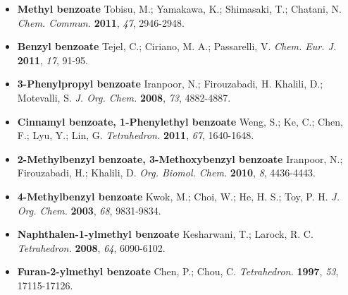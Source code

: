\frenchspacing
\begin{itemize}
  \item \textbf{Methyl benzoate} Tobisu, M.; Yamakawa, K.; Shimasaki,
  T.; Chatani, N. \textit{Chem. Commun.} \textbf{2011}, \textit{47}, 2946-2948.
  \item \textbf{Benzyl benzoate} Tejel, C.; Ciriano, M. A.; Passarelli, V.
  \textit{Chem. Eur. J.} \textbf{2011}, \textit{17}, 91-95.
  \item \textbf{3-Phenylpropyl benzoate} Iranpoor, N.; Firouzabadi,
  H. Khalili, D.; Motevalli, S. \textit{J. Org. Chem.} \textbf{2008},
  \textit{73}, 4882-4887.
   \item \textbf{Cinnamyl benzoate, 1-Phenylethyl benzoate}
  Weng, S.; Ke, C.; Chen, F.; Lyu, Y.; Lin, G. \textit{Tetrahedron.}
  \textbf{2011}, \textit{67}, 1640-1648.
  \item \textbf{2-Methylbenzyl benzoate, 3-Methoxybenzyl benzoate}
  Iranpoor, N.; Firouzabadi, H.; Khalili, D. \textit{Org. Biomol. Chem.}
  \textbf{2010}, \textit{8}, 4436-4443.
  \item \textbf{4-Methylbenzyl benzoate} Kwok, M.; Choi, W.; He, H. S.;
  Toy, P. H. \textit{J. Org. Chem.} \textbf{2003}, \textit{68}, 9831-9834.
  \item \textbf{Naphthalen-1-ylmethyl benzoate} Kesharwani, T.;
  Larock, R. C. \textit{Tetrahedron.} \textbf{2008}, \textit{64}, 6090-6102.
  \item \textbf{Furan-2-ylmethyl benzoate} Chen, P.; Chou, C.
  \textit{Tetrahedron.} \textbf{1997}, \textit{53}, 17115-17126.
\end{itemize}
\nonfrenchspacing


